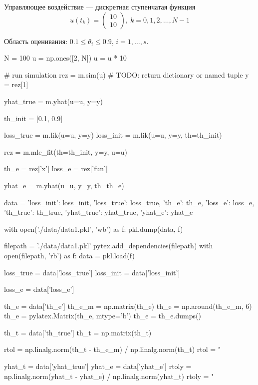 \documentclass[a4paper,14pt]{extarticle}
\begin{document}
\indent Управляющее воздействие --- дискретная ступенчатая функция
\[
  u(t_k) = \begin{pmatrix} 10 \\ 10 \end{pmatrix},\ k = 0, 1, 2, \ldots, N-1
\]

Область оценивания: $0.1 \le \theta_i \le 0.9$, $i = 1, \ldots, s$.

\begin{pycode}[model1]
N = 100
u = np.ones([2, N])
u = u * 10

# run simulation
rez = m.sim(u)  # TODO: return dictionary or named tuple
y = rez[1]

yhat_true = m.yhat(u=u, y=y)

th_init = [0.1, 0.9]

loss_true = m.lik(u=u, y=y)
loss_init = m.lik(u=u, y=y, th=th_init)

rez = m.mle_fit(th=th_init, y=y, u=u)

th_e = rez['x']
loss_e = rez['fun']

yhat_e = m.yhat(u=u, y=y, th=th_e)

data = {'loss_init': loss_init,
        'loss_true': loss_true,
        'th_e': th_e,
        'loss_e': loss_e,
        'th_true': th_true,
        'yhat_true': yhat_true,
        'yhat_e': yhat_e}

with open('./data/data1.pkl', 'wb') as f:
  pkl.dump(data, f)
\end{pycode}

\begin{pycode}
filepath = './data/data1.pkl'
pytex.add_dependencies(filepath)
with open(filepath, 'rb') as f:
  data = pkl.load(f)

loss_true = data['loss_true']
loss_init = data['loss_init']

loss_e = data['loss_e']

th_e = data['th_e']
th_e_m = np.matrix(th_e)
th_e = np.around(th_e_m, 6)
th_e = pylatex.Matrix(th_e, mtype='b')
th_e = th_e.dumps()

th_t = data['th_true']
th_t = np.matrix(th_t)

rtol = np.linalg.norm(th_t - th_e_m) / np.linalg.norm(th_t)
rtol = "%

yhat_t = data['yhat_true']
yhat_e = data['yhat_e']
rtoly = np.linalg.norm(yhat_t - yhat_e) / np.linalg.norm(yhat_t)
rtoly = "%
\end{pycode}
\end{document}
